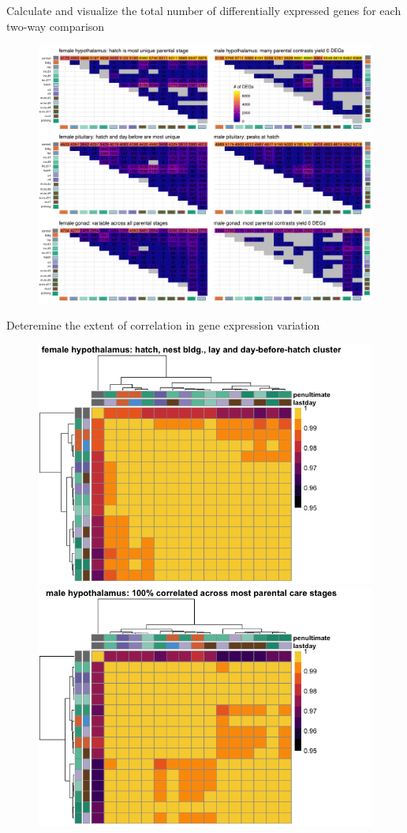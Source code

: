 \documentclass[final]{beamer}
\newlength{\onecolwid}
\newlength{\twocolwid}
\begin{document}
\begin{frame}[t]
\begin{columns}[t]
\begin{column}{\twocolwid}
\begin{columns}[t,totalwidth=\twocolwid]
\begin{column}{\onecolwid}
\begin{block}{{\normalsize Calculate and visualize  the total number of differentially expressed genes for each two-way comparison}}

\begin{figure}
\includegraphics[width=1\linewidth]{DoveParentsRNAseq_totalDEGs.png}
\end{figure}

\end{block}

\begin{block}{{\normalsize Deteremine the extent of correlation in gene expression variation}}


\begin{figure}
\includegraphics[width=0.5\linewidth]{correlationheatmaps-1.png}
\includegraphics[width=0.5\linewidth]{correlationheatmaps-4.png}
\end{figure}


\end{block}
\end{column}
\end{columns}
\end{column}
\end{columns}
\end{frame}
\end{document}
